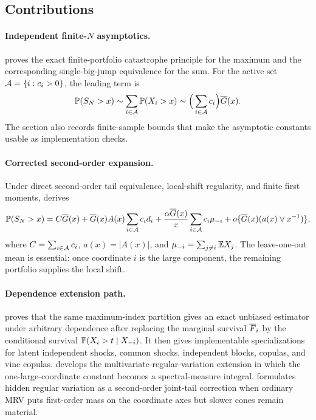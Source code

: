 \subsection{Contributions}

\paragraph{Independent finite-$N$ asymptotics.}
 proves the exact finite-portfolio catastrophe
principle for the maximum and the corresponding single-big-jump equivalence for
the sum. For the active set $\mathcal{A}=\{i:c_i>0\}$, the leading term is
\[
  \mathbb{P}(S_N>x)\sim \sum_{i\in\mathcal{A}}\mathbb{P}(X_i>x)
  \sim \Big(\sum_{i\in\mathcal{A}}c_i\Big)\overline{G}(x).
\]
The section also records finite-sample bounds that make the asymptotic constants
usable as implementation checks.

\paragraph{Corrected second-order expansion.}
Under direct second-order tail equivalence, local-shift regularity, and finite
first moments,  derives
\[
  \mathbb{P}(S_N>x)
  = C\overline{G}(x)
    + \overline{G}(x)A(x)\sum_{i\in\mathcal{A}}c_i d_i
    + {\alpha\overline{G}(x)\over x}\sum_{i\in\mathcal{A}}c_i\mu_{-i}
    + o\{\overline{G}(x)(a(x)\vee x^{-1})\},
\]
where $C=\sum_{i\in\mathcal{A}}c_i$, $a(x)=|A(x)|$, and
$\mu_{-i}=\sum_{j\ne i}\mathbb{E} X_j$. The leave-one-out mean is essential: once
coordinate $i$ is the large component, the remaining portfolio supplies the
local shift.

\paragraph{Dependence extension path.}
 proves that the same maximum-index partition gives an
exact unbiased estimator under arbitrary dependence after replacing the marginal
survival $\overline{F}_i$ by the conditional survival $\mathbb{P}(X_i>t\mid X_{-i})$. It then
gives implementable specializations for latent independent shocks, common shocks,
independent blocks, copulas, and vine copulas.  develops
the multivariate-regular-variation extension in which the one-large-coordinate
constant becomes a spectral-measure integral.  formulates
hidden regular variation as a second-order joint-tail correction when ordinary
MRV puts first-order mass on the coordinate axes but slower cones remain
material.

